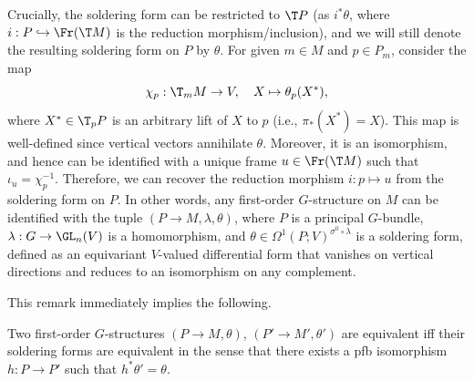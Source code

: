 \begin{rem}\label{rem G-structure as soldering}
    Crucially, the soldering form can be restricted to $\T P$ (as $i^\ast\theta$, where $i:P\hookrightarrow \Fr(\T M)$ is the reduction morphism/inclusion), and we will still denote the resulting soldering form on $P$ by $\theta$. For given $m\in M$ and $p\in P_m$, consider the map 
    \[\chi_p:\T_m M\to V, \quad X\mapsto \theta_p(X^\ast),\]
    where $X^\ast\in \T_p P$ is an arbitrary lift of $X$ to $p$ (i.e., $\pi_\ast(X^\ast)=X$). This map is well-defined since vertical vectors annihilate $\theta$. Moreover, it is an isomorphism, and hence can be identified with a unique frame $u\in \Fr(\T M)$ such that $\iota_u=\chi_p^{-1}$. Therefore, we can recover the reduction morphism $i:p\mapsto u$ from the soldering form on $P$. In other words, any first-order $G$-structure on $M$ can be identified with the tuple $(P\to M,\lambda,\theta)$, where $P$ is a principal $G$-bundle, $\lambda:G\to \GL_n(V)$ is a homomorphism, and $\theta\in \Omega^1(P;V)^{\sigma^0\circ\lambda}$ is a soldering form, defined as an equivariant $V$-valued differential form that vanishes on vertical directions and reduces to an isomorphism on any complement.
\end{rem}

This remark immediately implies the following.

\begin{cor}
    Two first-order $G$-structures $(P\to M,\theta)$, $(P'\to M',\theta')$ are equivalent iff their soldering forms are equivalent in the sense that there exists a \gls{pfb} isomorphism $h:P\to P'$ such that $h^\ast\theta'=\theta$.
\end{cor}

